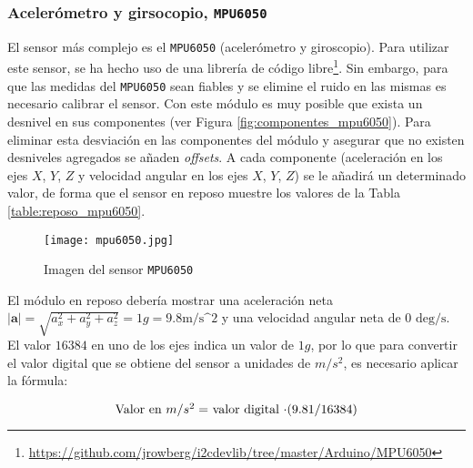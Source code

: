 \subsubsection{Acelerómetro y girsocopio, \texttt{MPU6050}}


El sensor más complejo es el \texttt{MPU6050} (acelerómetro y giroscopio). Para utilizar este sensor, se ha hecho uso de una librería de código libre\footnote{\url{https://github.com/jrowberg/i2cdevlib/tree/master/Arduino/MPU6050}}. Sin embargo, para que las medidas del \texttt{MPU6050} sean fiables y se elimine el ruido en las mismas es necesario calibrar el sensor. Con este módulo es muy posible que exista un desnivel en sus componentes (ver Figura \ref{fig:componentes_mpu6050}). Para eliminar esta desviación en las componentes del módulo y asegurar que no existen desniveles agregados se añaden \textit{offsets}. A cada componente (aceleración en los ejes $X$, $Y$, $Z$ y velocidad angular en los ejes $X$, $Y$, $Z$) se le añadirá un determinado valor, de forma que el sensor en reposo muestre los valores de la Tabla \ref{table:reposo_mpu6050}. 

\begin{wrapfigure}{r}{0.2\linewidth}
    \centering
    \texttt{[image: mpu6050.jpg]}
    \caption{Imagen del sensor \texttt{MPU6050} \protect\footnotemark}
    \label{fig:myfig}
\end{wrapfigure}


El módulo en reposo debería mostrar una aceleración neta $| \mathbf{a} | = \sqrt{a_x^2 + a_y^2 + a_z^2} = 1g = 9.8\text{m/s^2}$ y una velocidad angular neta de $0$ $\text{deg/s}$. El valor $16384$ en uno de los ejes indica un valor de $1g$, por lo que para convertir el valor digital que se obtiene del sensor a unidades de $m/s^2$, es necesario aplicar la fórmula: 

\begin{center}
\begin{equation}
$Valor en $m/s^2 = $ valor digital $\cdot (9.81 / 16384)
\end{equation}
\end{center}

